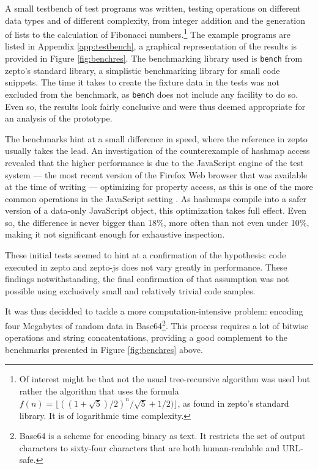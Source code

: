 \documentclass[oneside,11pt,xetex]{scrbook}
\begin{document}
A small testbench of test programs was written, testing operations on
different data types and of different complexity, from integer addition and
the generation of lists to the calculation of Fibonacci numbers.\footnote{Of interest
might be that not the usual tree-recursive algorithm was used but rather the
algorithm that uses the formula \(f(n) = \lfloor{((1 + \sqrt{5}) / 2)^n / \sqrt{5} + 1/2)}\rfloor\),
as found in zepto's standard library. It is of logarithmic time complexity.}
The example programs are listed in Appendix \ref{app:testbench}, a graphical
representation of the results is provided in Figure \ref{fig:benchres}. The
benchmarking library used is \texttt{bench} from zepto's standard library,
a simplistic benchmarking library for small code snippets. The time it takes to
create the fixture data in the tests was not excluded from the benchmark, as
\texttt{bench} does not include any facility to do so. Even so, the results look
fairly conclusive and were thus deemed appropriate for an analysis of the
prototype.

The benchmarks hint at a small difference in speed, where the reference
in zepto usually takes the lead. An investigation of the counterexample of
hashmap access revealed that the higher performance is due to the JavaScript
engine of the test system --- the most recent version of the Firefox Web browser
that was available at the time of writing --- optimizing for property access, as
this is one of the more common operations in the JavaScript setting \parencite{JSPA}.
As hashmaps compile into a safer version of a data-only JavaScript object, this
optimization takes full effect. Even so, the difference is never bigger than 18\%,
more often than not even under 10\%, making it not significant enough
for exhaustive inspection.

These initial tests seemed to hint at a confirmation of the hypothesis: code executed
in zepto and zepto-js does not vary greatly in performance. These findings notwithstanding,
the final confirmation of that assumption was not possible using exclusively small and
relatively trivial code samples.

It was thus decidded to tackle a more computation-intensive problem:
encoding four Megabytes of random data in Base64\footnote{Base64 is a scheme
for encoding binary as text. It restricts the set of output characters to
sixty-four characters that are both human-readable and URL-safe.}. This
process requires a lot of bitwise operations and string concatentations,
providing a good complement to the benchmarks presented in Figure
\ref{fig:benchres} above.
\end{document}
